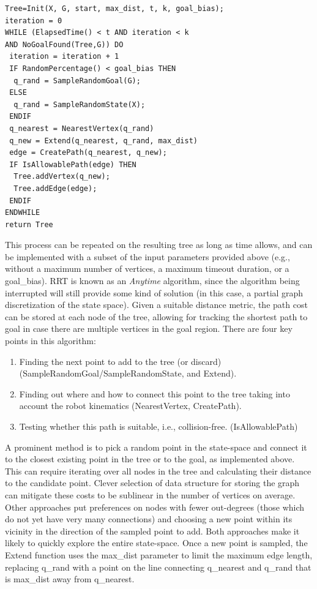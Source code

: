 \begin{verbatim}
Tree=Init(X, G, start, max_dist, t, k, goal_bias);
iteration = 0
WHILE (ElapsedTime() < t AND iteration < k 
AND NoGoalFound(Tree,G)) DO
 iteration = iteration + 1
 IF RandomPercentage() < goal_bias THEN
  q_rand = SampleRandomGoal(G);
 ELSE
  q_rand = SampleRandomState(X);
 ENDIF
 q_nearest = NearestVertex(q_rand)
 q_new = Extend(q_nearest, q_rand, max_dist)
 edge = CreatePath(q_nearest, q_new);
 IF IsAllowablePath(edge) THEN
  Tree.addVertex(q_new);
  Tree.addEdge(edge);
 ENDIF
ENDWHILE
return Tree
\end{verbatim}

This process can be repeated on the resulting tree as long as time allows, and can be implemented with a subset of the input parameters provided above (e.g., without a maximum number of vertices, a maximum timeout duration, or a goal\_bias). RRT is known as an  \textsl{Anytime} algorithm, since the algorithm being interrupted will still provide some kind of solution (in this case, a partial graph discretization of the state space). Given a suitable distance metric, the path cost can be stored at each node of the tree, allowing for tracking the shortest path to goal in case there are multiple vertices in the goal region.
There are four key points in this algorithm:

\begin{enumerate}
    \item Finding the next point to add to the tree (or discard) (SampleRandomGoal/SampleRandomState, and Extend).
    \item Finding out where and how to connect this point to the tree taking into account the robot kinematics (NearestVertex, CreatePath).
    \item Testing whether this path is suitable, i.e., collision-free. (IsAllowablePath)
\end{enumerate}

A prominent method is to pick a random point in the state-space and connect it to the closest existing point in the tree or to the goal, as implemented above. This can require iterating over all nodes in the tree and calculating their distance to the candidate point. Clever selection of data structure for storing the graph can mitigate these costs to be sublinear in the number of vertices on average. Other approaches put preferences on nodes with fewer out-degrees (those which do not yet have very many connections) and choosing a new point within its vicinity in the direction of the sampled point to add. Both approaches make it likely to quickly explore the entire state-space. Once a new point is sampled, the Extend function uses the max\_dist parameter to limit the maximum edge length, replacing q\_rand with a point on the line connecting q\_nearest and q\_rand that is max\_dist away from q\_nearest.

